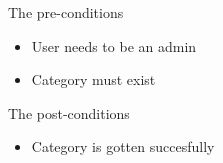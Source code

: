 The pre-conditions
\begin{itemize}
  \item User needs to be an admin
  \item Category must exist
\end{itemize}

The post-conditions
\begin{itemize}
  \item Category is gotten succesfully
\end{itemize}







